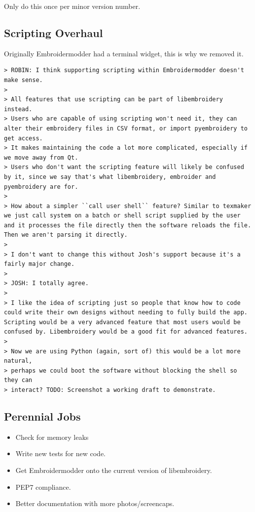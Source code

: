 \documentclass[10pt]{report}
\begin{document}
Only do this once per minor version number.

\subsection{Scripting Overhaul}

Originally Embroidermodder had a terminal widget, this is why we removed it.

\begin{verbatim}
> ROBIN: I think supporting scripting within Embroidermodder doesn't make sense.
> 
> All features that use scripting can be part of libembroidery instead.
> Users who are capable of using scripting won't need it, they can alter their embroidery files in CSV format, or import pyembroidery to get access.
> It makes maintaining the code a lot more complicated, especially if we move away from Qt.
> Users who don't want the scripting feature will likely be confused by it, since we say that's what libembroidery, embroider and pyembroidery are for.
> 
> How about a simpler ``call user shell`` feature? Similar to texmaker we just call system on a batch or shell script supplied by the user and it processes the file directly then the software reloads the file. Then we aren't parsing it directly.
> 
> I don't want to change this without Josh's support because it's a fairly major change.
>
> JOSH: I totally agree.
> 
> I like the idea of scripting just so people that know how to code could write their own designs without needing to fully build the app. Scripting would be a very advanced feature that most users would be confused by. Libembroidery would be a good fit for advanced features.
> 
> Now we are using Python (again, sort of) this would be a lot more natural,
> perhaps we could boot the software without blocking the shell so they can
> interact? TODO: Screenshot a working draft to demonstrate.
\end{verbatim}

\subsection{Perennial Jobs}

\begin{itemize}
\item Check for memory leaks
\item Write new tests for new code.
\item Get Embroidermodder onto the current version of libembroidery.
\item PEP7 compliance.
\item Better documentation with more photos/screencaps.
\end{itemize}
\end{document}
